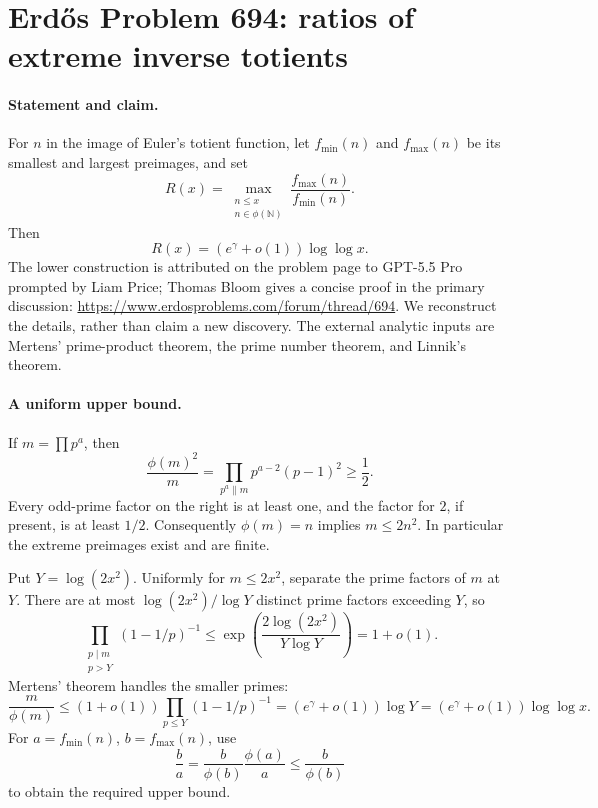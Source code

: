 \section*{Erd\H{o}s Problem 694: ratios of extreme inverse totients}

\paragraph{Statement and claim.}
For \(n\) in the image of Euler's totient function, let
\(f_{\min}(n)\) and \(f_{\max}(n)\) be its smallest and largest
preimages, and set
\[
 R(x)=\max_{\substack{n\leq x\\n\in\phi(\mathbb N)}}
             \frac{f_{\max}(n)}{f_{\min}(n)}.
\]
Then
\[
 R(x)=(e^\gamma+o(1))\log\log x.
\]
The lower construction is attributed on the problem page to
GPT-5.5 Pro prompted by Liam Price; Thomas Bloom gives a concise
proof in the primary discussion:
\url{https://www.erdosproblems.com/forum/thread/694}.
We reconstruct the details, rather than claim a new discovery.
The external analytic inputs are Mertens' prime-product theorem,
the prime number theorem, and Linnik's theorem.

\paragraph{A uniform upper bound.}
If \(m=\prod p^a\), then
\[
 \frac{\phi(m)^2}{m}=\prod_{p^a\parallel m}p^{a-2}(p-1)^2
 \geq\frac12.
\]
Every odd-prime factor on the right is at least one, and the
factor for \(2\), if present, is at least \(1/2\).
Consequently \(\phi(m)=n\) implies \(m\leq2n^2\).
In particular the extreme preimages exist and are finite.

Put \(Y=\log(2x^2)\). Uniformly for \(m\leq2x^2\), separate the
prime factors of \(m\) at \(Y\). There are at most
\(\log(2x^2)/\log Y\) distinct prime factors exceeding \(Y\), so
\[
 \prod_{\substack{p\mid m\\p>Y}}(1-1/p)^{-1}
 \leq\exp\left(\frac{2\log(2x^2)}{Y\log Y}\right)=1+o(1).
\]
Mertens' theorem handles the smaller primes:
\[
 \frac m{\phi(m)}
 \leq(1+o(1))\prod_{p\leq Y}(1-1/p)^{-1}
 =(e^\gamma+o(1))\log Y
 =(e^\gamma+o(1))\log\log x.
\]
For \(a=f_{\min}(n)\), \(b=f_{\max}(n)\), use
\[
 \frac ba=\frac b{\phi(b)}\frac{\phi(a)}a
          \leq\frac b{\phi(b)}
\]
to obtain the required upper bound.

